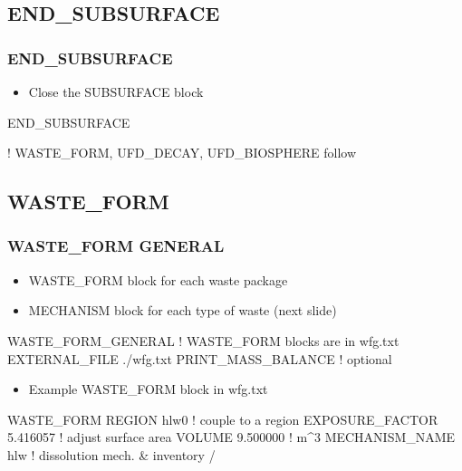 \documentclass{beamer}
\newcommand\redcomment[1]{{{\color{red} #1}}}
\newcommand\bluecomment[1]{{{\color{blue} #1}}}
\newcommand\greencomment[1]{{{\color{green} #1}}}
\begin{document}
\subsection{END\_SUBSURFACE}
\begin{frame}[fragile]\frametitle{END\_SUBSURFACE}

\begin{itemize}
  \item Close the SUBSURFACE block
\end{itemize}

\begin{semiverbatim}
END_SUBSURFACE 

\bluecomment{! WASTE_FORM, UFD_DECAY, UFD_BIOSPHERE follow}
\end{semiverbatim}
\end{frame}

\subsection{WASTE\_FORM}
\begin{frame}[fragile]\frametitle{WASTE\_FORM GENERAL}

\begin{itemize}
  \item \redcomment{WASTE\_FORM} block for each waste package
  \item \redcomment{MECHANISM} block for each type of waste (next slide)
\end{itemize}

\begin{semiverbatim}\small
WASTE_FORM_GENERAL
  \bluecomment{! WASTE_FORM blocks are in} \greencomment{wfg.txt}
  EXTERNAL_FILE ./wfg.txt
  PRINT_MASS_BALANCE \bluecomment{! optional}
\end{semiverbatim}

\begin{itemize}\small
  \item Example \redcomment{WASTE\_FORM} block in \greencomment{wfg.txt}
\end{itemize}

\begin{semiverbatim}
  WASTE_FORM
     REGION hlw0              \bluecomment{! couple to a region}
     EXPOSURE_FACTOR 5.416057 \bluecomment{! adjust surface area}
     VOLUME 9.500000 \bluecomment{! m^3}
     MECHANISM_NAME hlw \bluecomment{! dissolution mech. & inventory}
  /
\end{semiverbatim}
\end{frame}
\end{document}
